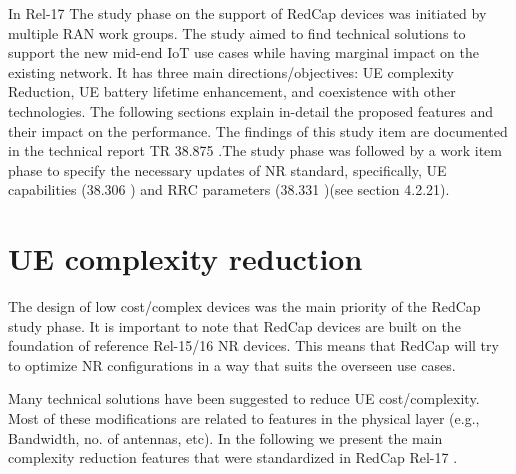 \documentclass[conference]{IEEEtran}
\begin{document}
In Rel-17 The study phase on the support of RedCap devices was initiated by multiple RAN work groups. The study aimed to find technical solutions to support the new mid-end IoT use cases while having marginal impact on the existing network. It has three main directions/objectives: UE complexity Reduction, UE battery lifetime enhancement, and coexistence with other technologies. The following sections explain in-detail the proposed features and their impact on the performance. The findings of this study item are documented in the technical report TR 38.875 \cite{3gpp.38.875}.The study phase was followed by a work item phase to specify the necessary updates of NR standard, specifically,  UE capabilities (38.306 \cite{3gpp_nr_nodate-4_38.306})  and RRC parameters (38.331 \cite{3gpp_nr_nodate-3_38.331})(see section 4.2.21).

\section{UE complexity reduction}
\label{sec:4-complexity-reduction}






The design of low cost/complex devices was the main priority of the RedCap study phase. It is important to note that RedCap devices are built on the foundation of reference Rel-15/16 NR devices. This means that RedCap will try to optimize NR configurations in a way that suits the overseen use cases.

Many technical solutions have been suggested to reduce UE cost/complexity. Most of these modifications are related to features in the physical layer (e.g., Bandwidth, no. of antennas, etc). In the following we present the main complexity reduction features that were standardized in RedCap Rel-17 \cite{3gpp.38.875}.
\end{document}
